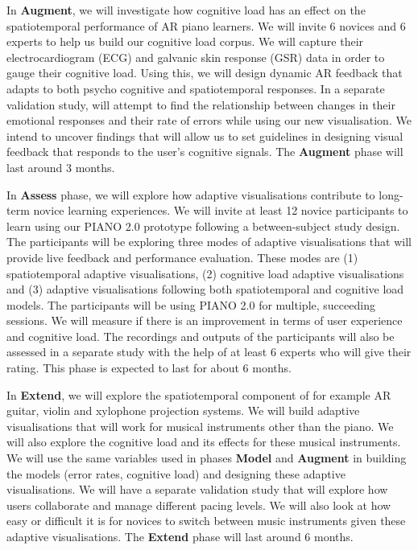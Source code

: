 \documentclass[manuscript,screen]{acmart}
\begin{document}
In \textbf{Augment}, we will investigate how cognitive load has an effect on the spatiotemporal performance of AR piano learners. We will invite 6 novices and 6 experts to help us build our cognitive load corpus. We will capture their electrocardiogram (ECG) and galvanic skin response (GSR) data in order to gauge their cognitive load. Using this, we will design dynamic AR feedback that adapts to both psycho cognitive and spatiotemporal responses. In a separate validation study, will attempt to find the relationship between changes in their emotional responses and their rate of errors while using our new visualisation. We intend to uncover findings that will allow us to set guidelines in designing visual feedback that responds to the user's cognitive signals. The \textbf{Augment} phase will last around 3 months. 

In \textbf{Assess} phase, we will explore how adaptive visualisations contribute to long-term novice learning experiences. We will invite at least 12 novice participants to learn using our PIANO 2.0 prototype following a between-subject study design. The participants will be exploring three modes of adaptive visualisations that will provide live feedback and performance evaluation. These modes are (1) spatiotemporal adaptive visualisations, (2) cognitive load adaptive visualisations and (3) adaptive visualisations following both spatiotemporal and cognitive load models. The participants will be using PIANO 2.0 for multiple, succeeding sessions. We will measure if there is an improvement in terms of user experience and cognitive load. The recordings and outputs of the participants will also be assessed in a separate study with the help of at least 6 experts who will give their rating. This phase is expected to last for about 6 months. 

In \textbf{Extend}, we will explore the spatiotemporal component of for example AR guitar, violin and xylophone projection systems. We will build adaptive visualisations that will work for musical instruments other than the piano. We will also explore the cognitive load and its effects for these musical instruments. We will use the same variables used in phases \textbf{Model} and \textbf{Augment} in building the models (error rates, cognitive load) and designing these adaptive visualisations. We will have a separate validation study that will explore how users collaborate and manage different pacing levels. We will also look at how easy or difficult it is for novices to switch between music instruments given these adaptive visualisations. The \textbf{Extend} phase will last around 6 months. 
\end{document}
